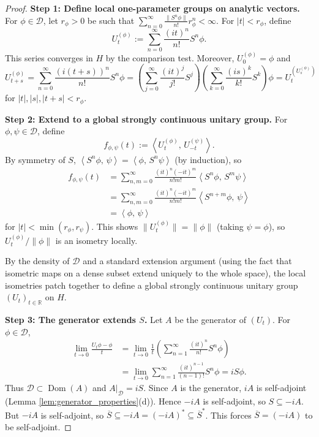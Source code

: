 \documentclass[11pt]{article}
\theoremstyle{definition}
\theoremstyle{remark}
\newcommand{\R}{\mathbb{R}}
\newcommand{\1}{\mathbbm{1}}
\newcommand{\ip}[2]{\left\langle #1,\,#2 \right\rangle}
\newcommand{\norm}[1]{\left\lVert #1 \right\rVert}
\DeclareMathOperator{\Dom}{Dom}
\begin{document}
\begin{proof}
\textbf{Step 1: Define local one-parameter groups on analytic vectors.}
For $\phi\in\mathcal{D}$, let $r_\phi>0$ be such that $\sum_{n=0}^\infty\frac{\norm{S^n\phi}}{n!}r_\phi^n<\infty$. For $|t|<r_\phi$, define
\[
U_t^{(\phi)}:=\sum_{n=0}^\infty\frac{(it)^n}{n!}S^n\phi.
\]
This series converges in $H$ by the comparison test. Moreover, $U_0^{(\phi)}=\phi$ and
\[
U_{t+s}^{(\phi)}=\sum_{n=0}^\infty\frac{(i(t+s))^n}{n!}S^n\phi=\left(\sum_{j=0}^\infty\frac{(it)^j}{j!}S^j\right)\left(\sum_{k=0}^\infty\frac{(is)^k}{k!}S^k\right)\phi=U_t^{(U_s^{(\phi)})}
\]
for $|t|,|s|,|t+s|<r_\phi$.

\textbf{Step 2: Extend to a global strongly continuous unitary group.}
For $\phi,\psi\in\mathcal{D}$, define
\[
f_{\phi,\psi}(t):=\ip{U_t^{(\phi)}}{U_{-t}^{(\psi)}}.
\]
By symmetry of $S$, $\ip{S^n\phi}{\psi}=\ip{\phi}{S^n\psi}$ (by induction), so
\begin{align*}
f_{\phi,\psi}(t)&=\sum_{n,m=0}^\infty\frac{(it)^n(-it)^m}{n!m!}\ip{S^n\phi}{S^m\psi}\\
&=\sum_{n,m=0}^\infty\frac{(it)^n(-it)^m}{n!m!}\ip{S^{n+m}\phi}{\psi}\\
&=\ip{\phi}{\psi}
\end{align*}
for $|t|<\min(r_\phi,r_\psi)$. This shows $\|U_t^{(\phi)}\|=\|\phi\|$ (taking $\psi=\phi$), so $U_t^{(\phi)}/\|\phi\|$ is an isometry locally.

By the density of $\mathcal{D}$ and a standard extension argument (using the fact that isometric maps on a dense subset extend uniquely to the whole space), the local isometries patch together to define a global strongly continuous unitary group $(U_t)_{t\in\R}$ on $H$.

\textbf{Step 3: The generator extends $S$.}
Let $A$ be the generator of $(U_t)$. For $\phi\in\mathcal{D}$,
\begin{align*}
\lim_{t\to 0}\frac{U_t\phi-\phi}{t}&=\lim_{t\to 0}\frac{1}{t}\left(\sum_{n=1}^\infty\frac{(it)^n}{n!}S^n\phi\right)\\
&=\lim_{t\to 0}\sum_{n=1}^\infty\frac{(it)^{n-1}}{(n-1)!}S^n\phi=iS\phi.
\end{align*}
Thus $\mathcal{D}\subset\Dom(A)$ and $A|_{\mathcal{D}}=iS$. Since $A$ is the generator, $iA$ is self-adjoint (Lemma \ref{lem:generator_properties}(d)). Hence $-iA$ is self-adjoint, so $S\subseteq -iA$. But $-iA$ is self-adjoint, so $\overline{S}\subseteq -iA=(-iA)^*\subseteq\overline{S}^*$. This forces $\overline{S}=(-iA)$ to be self-adjoint.
\end{proof}
\end{document}

